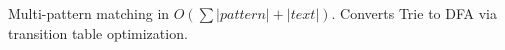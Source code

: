 
Multi-pattern matching in $O(\sum |pattern| + |text|)$. Converts Trie to DFA via transition table optimization.


